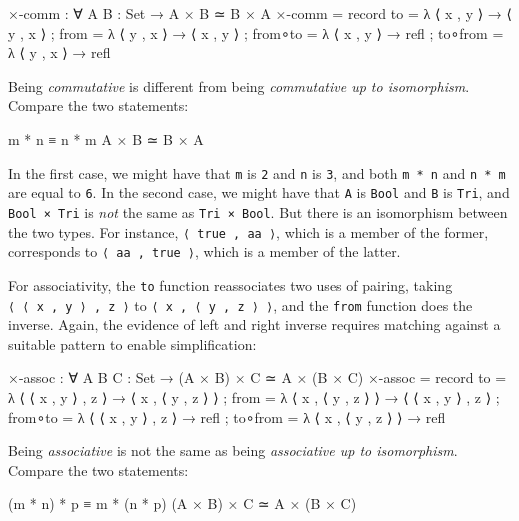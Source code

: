 \begin{fence}
\begin{code}
×-comm : ∀ {A B : Set} → A × B ≃ B × A
×-comm =
  record
    { to       =  λ{ ⟨ x , y ⟩ → ⟨ y , x ⟩ }
    ; from     =  λ{ ⟨ y , x ⟩ → ⟨ x , y ⟩ }
    ; from∘to  =  λ{ ⟨ x , y ⟩ → refl }
    ; to∘from  =  λ{ ⟨ y , x ⟩ → refl }
    }
\end{code}
\end{fence}

Being \emph{commutative} is different from being \emph{commutative up to
isomorphism}. Compare the two statements:

\begin{myDisplay}
m * n ≡ n * m
A × B ≃ B × A
\end{myDisplay}

In the first case, we might have that \texttt{m} is \texttt{2} and
\texttt{n} is \texttt{3}, and both \texttt{m\ *\ n} and \texttt{n\ *\ m}
are equal to \texttt{6}. In the second case, we might have that
\texttt{A} is \texttt{Bool} and \texttt{B} is \texttt{Tri}, and
\texttt{Bool\ ×\ Tri} is \emph{not} the same as \texttt{Tri\ ×\ Bool}.
But there is an isomorphism between the two types. For instance,
\texttt{⟨\ true\ ,\ aa\ ⟩}, which is a member of the former, corresponds
to \texttt{⟨\ aa\ ,\ true\ ⟩}, which is a member of the latter.

For associativity, the \texttt{to} function reassociates two uses of
pairing, taking \texttt{⟨\ ⟨\ x\ ,\ y\ ⟩\ ,\ z\ ⟩} to
\texttt{⟨\ x\ ,\ ⟨\ y\ ,\ z\ ⟩\ ⟩}, and the \texttt{from} function does
the inverse. Again, the evidence of left and right inverse requires
matching against a suitable pattern to enable simplification:

\begin{fence}
\begin{code}
×-assoc : ∀ {A B C : Set} → (A × B) × C ≃ A × (B × C)
×-assoc =
  record
    { to      = λ{ ⟨ ⟨ x , y ⟩ , z ⟩ → ⟨ x , ⟨ y , z ⟩ ⟩ }
    ; from    = λ{ ⟨ x , ⟨ y , z ⟩ ⟩ → ⟨ ⟨ x , y ⟩ , z ⟩ }
    ; from∘to = λ{ ⟨ ⟨ x , y ⟩ , z ⟩ → refl }
    ; to∘from = λ{ ⟨ x , ⟨ y , z ⟩ ⟩ → refl }
    }
\end{code}
\end{fence}

Being \emph{associative} is not the same as being \emph{associative up
to isomorphism}. Compare the two statements:

\begin{myDisplay}
(m * n) * p ≡ m * (n * p)
(A × B) × C ≃ A × (B × C)
\end{myDisplay}

